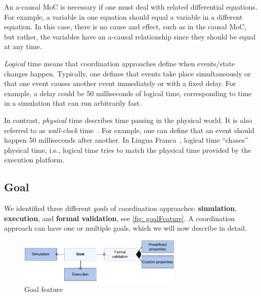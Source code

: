 \documentclass[runningheads]{llncs}
\newcommand{\quotes}[1]{``#1''}
\begin{document}
An a-causal MoC is necessary if one must deal with related differential equations.
For example, a variable in one equation should equal a variable in a different equation.
In this case, there is no cause and effect, such as in the causal MoC, but rather, the variables have an a-causal relationship since they should be equal at any time.

\textit{Logical} time means that coordination approaches define when events/state changes happen.
Typically, one defines that events take place simultaneously or that one event causes another event immediately or with a fixed delay.
For example, a delay could be 50 milliseconds of logical time, corresponding to time in a simulation that can run arbitrarily fast.

In contrast, \textit{physical} time describes time passing in the physical world.
It is also referred to as \textit{wall-clock} time~\cite{gomesCoSimulationSurvey2019}.
For example, one can define that an event should happen 50 milliseconds after another.
In Lingua Franca~\cite{lohstrohReactorsDeterministicModel2020}, logical time \quotes{chases} physical time, i.e., logical time tries to match the physical time provided by the execution platform.


\subsection{Goal} %
We identified three different \textit{goals} of coordination approaches: \textbf{simulation}, \textbf{execution}, and \textbf{formal validation}, see \autoref{fig: goalFeature}.
A coordination approach can have one or multiple goals, which we will now describe in detail.

\begin{figure}[ht]
	\centering
	\includegraphics[width=0.7\textwidth]{images/goal_feature}
	\caption{Goal feature}
	\label{fig: goalFeature}
\end{figure}
\end{document}
